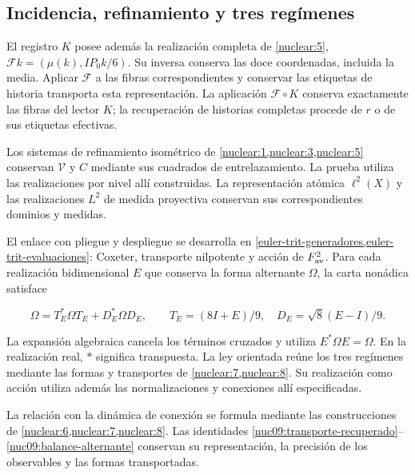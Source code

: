 \subsection{Incidencia, refinamiento y tres regímenes}

El registro \(K\) posee además la realización completa de
\cref{nuclear:5},
\(\mathcal Fk=(\mu(k),IP_0k/6)\).
Su inversa conserva las doce coordenadas, incluida la media.
Aplicar \(\mathcal F\) a las fibras correspondientes y conservar
las etiquetas de historia transporta esta representación.
La aplicación \(\mathcal F\circ K\) conserva exactamente las fibras
del lector \(K\); la recuperación de historias completas procede
de \(r\) o de sus etiquetas efectivas.

Los sistemas de refinamiento isométrico de
\cref{nuclear:1,nuclear:3,nuclear:5} conservan
\(\mathcal V\) y \(C\) mediante sus cuadrados de entrelazamiento.
La prueba utiliza las realizaciones por nivel allí construidas.
La representación atómica \(\ell^2(X)\) y las realizaciones
\(L^2\) de medida proyectiva conservan sus correspondientes
dominios y medidas.

El enlace con pliegue y despliegue se desarrolla en
\cref{euler-trit-generadores,euler-trit-evaluaciones}:
Coxeter, transporte nilpotente y acción de \(F_{\rm av}^2\).
Para cada realización bidimensional \(E\) que conserva la forma
alternante \(\Omega\), la carta nonádica satisface



\begin{equation}
\Omega=T_E^*\Omega T_E+D_E^*\Omega D_E,
\qquad T_E=(8I+E)/9,\quad D_E=\sqrt8(E-I)/9.
\label{nuc09:balance-alternante}
\end{equation}



La expansión algebraica cancela los términos cruzados y utiliza
\(E^*\Omega E=\Omega\). En la realización real,
\(*\) significa transpuesta.
La ley orientada reúne los tres regímenes mediante las formas
y transportes de \cref{nuclear:7,nuclear:8}.
Su realización como acción utiliza además las normalizaciones
y conexiones allí especificadas.

La relación con la dinámica de conexión se formula mediante
las construcciones de \cref{nuclear:6,nuclear:7,nuclear:8}.
Las identidades
\eqref{nuc09:transporte-recuperado}--\eqref{nuc09:balance-alternante}
conservan su representación, la precisión de los observables
y las formas transportadas.
